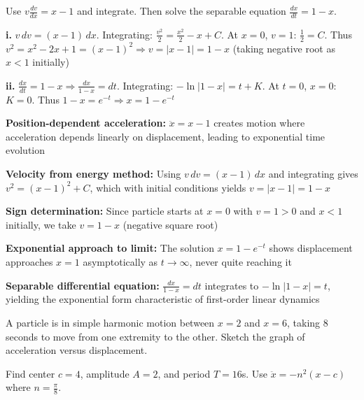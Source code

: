 \begin{hint}
Use $v\frac{dv}{dx} = x - 1$ and integrate. Then solve the separable equation $\frac{dx}{dt} = 1 - x$.
\end{hint}

\begin{solution}
\textbf{i.} $v\,dv = (x-1)\,dx$. Integrating: $\frac{v^2}{2} = \frac{x^2}{2} - x + C$. At $x=0$, $v=1$: $\frac{1}{2} = C$. Thus $v^2 = x^2 - 2x + 1 = (x-1)^2 \Rightarrow v = |x-1| = 1-x$ (taking negative root as $x < 1$ initially) 

\textbf{ii.} $\frac{dx}{dt} = 1 - x \Rightarrow \frac{dx}{1-x} = dt$. Integrating: $-\ln|1-x| = t + K$. At $t=0$, $x=0$: $K = 0$. Thus $1-x = e^{-t} \Rightarrow x = 1 - e^{-t}$ 
\end{solution}

\begin{takeaways}
\item \textbf{Position-dependent acceleration:} $\ddot{x} = x - 1$ creates motion where acceleration depends linearly on displacement, leading to exponential time evolution
\item \textbf{Velocity from energy method:} Using $v\,dv = (x-1)\,dx$ and integrating gives $v^2 = (x-1)^2 + C$, which with initial conditions yields $v = |x-1| = 1-x$
\item \textbf{Sign determination:} Since particle starts at $x=0$ with $v=1 > 0$ and $x < 1$ initially, we take $v = 1-x$ (negative square root)
\item \textbf{Exponential approach to limit:} The solution $x = 1 - e^{-t}$ shows displacement approaches $x = 1$ asymptotically as $t \to \infty$, never quite reaching it
\item \textbf{Separable differential equation:} $\frac{dx}{1-x} = dt$ integrates to $-\ln|1-x| = t$, yielding the exponential form characteristic of first-order linear dynamics
\end{takeaways}

\begin{problem}
A particle is in simple harmonic motion between $x = 2$ and $x = 6$, taking 8 seconds to move from one extremity to the other. Sketch the graph of acceleration versus displacement.
\end{problem}

\begin{hint}
Find center $c = 4$, amplitude $A = 2$, and period $T = 16$s. Use $\ddot{x} = -n^2(x-c)$ where $n = \frac{\pi}{8}$.
\end{hint}

